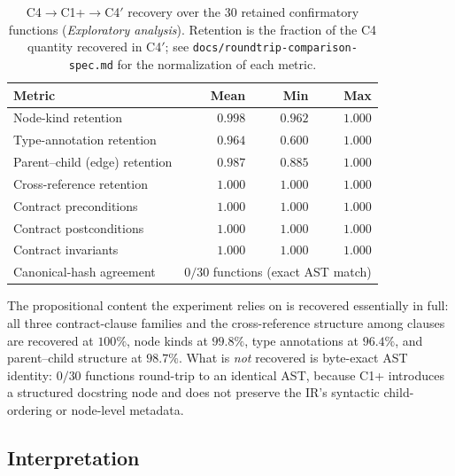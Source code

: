 \begin{table}[h]
\centering
\small
\caption{C4$\rightarrow$C1+$\rightarrow$C4$'$ recovery over the 30 retained
confirmatory functions (\emph{Exploratory analysis}). Retention is the fraction
of the C4 quantity recovered in C4$'$; see
\texttt{docs/roundtrip-comparison-spec.md} for the normalization of each metric.}
\label{tab:roundtrip}
\begin{tabular}{lrrr}
\toprule
Metric & Mean & Min & Max \\
\midrule
Node-kind retention            & $0.998$ & $0.962$ & $1.000$ \\
Type-annotation retention      & $0.964$ & $0.600$ & $1.000$ \\
Parent--child (edge) retention & $0.987$ & $0.885$ & $1.000$ \\
Cross-reference retention      & $1.000$ & $1.000$ & $1.000$ \\
Contract preconditions         & $1.000$ & $1.000$ & $1.000$ \\
Contract postconditions        & $1.000$ & $1.000$ & $1.000$ \\
Contract invariants            & $1.000$ & $1.000$ & $1.000$ \\
\midrule
Canonical-hash agreement       & \multicolumn{3}{l}{$0/30$ functions (exact AST match)} \\
\bottomrule
\end{tabular}
\end{table}

The propositional content the experiment relies on is recovered essentially in
full: all three contract-clause families and the cross-reference structure among
clauses are recovered at $100\%$, node kinds at $99.8\%$, type annotations at
$96.4\%$, and parent--child structure at $98.7\%$. What is \emph{not} recovered
is byte-exact AST identity: $0/30$ functions round-trip to an identical AST,
because C1+ introduces a structured docstring node and does not preserve the
IR's syntactic child-ordering or node-level metadata.

\subsection*{Interpretation}


